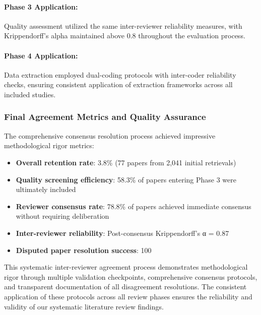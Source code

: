 \documentclass[acmsmall]{acmart}
\begin{document}
\paragraph{Phase 3 Application:} Quality assessment utilized the same inter-reviewer reliability measures, with Krippendorff's alpha maintained above 0.8 throughout the evaluation process.

\paragraph{Phase 4 Application:} Data extraction employed dual-coding protocols with inter-coder reliability checks, ensuring consistent application of extraction frameworks across all included studies.

\subsubsection{Final Agreement Metrics and Quality Assurance}\label{subsubsec:inter-reviewer-agreement-final-metrics}

The comprehensive consensus resolution process achieved impressive methodological rigor metrics:

\begin{itemize}
    \item \textbf{Overall retention rate}: 3.8\% (77 papers from 2,041 initial retrievals)
    \item \textbf{Quality screening efficiency}: 58.3\% of papers entering Phase 3 were ultimately included
    \item \textbf{Reviewer consensus rate}: 78.8\% of papers achieved immediate consensus without requiring deliberation
    \item \textbf{Inter-reviewer reliability}: Post-consensus Krippendorff's α = 0.87
    \item \textbf{Disputed paper resolution success}: 100%
\end{itemize}

This systematic inter-reviewer agreement process demonstrates methodological rigor through multiple validation checkpoints, comprehensive consensus protocols, and transparent documentation of all disagreement resolutions. The consistent application of these protocols across all review phases ensures the reliability and validity of our systematic literature review findings.

\end{document}
